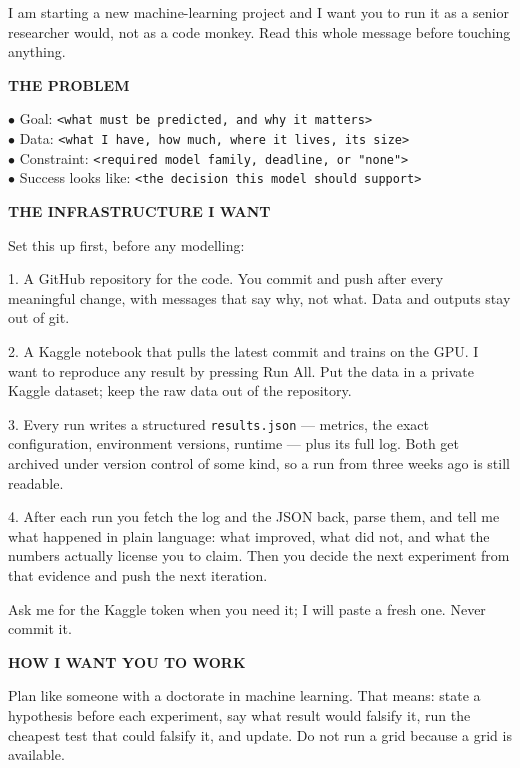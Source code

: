 \documentclass[11pt,a4paper]{article}
\begin{document}
\begin{promptbox}
\small
I am starting a new machine-learning project and I want you to run it as a
senior researcher would, not as a code monkey. Read this whole message before
touching anything.

\vspace{3pt}\textbf{THE PROBLEM}

$\bullet$ Goal: \texttt{<what must be predicted, and why it matters>}\\
$\bullet$ Data: \texttt{<what I have, how much, where it lives, its size>}\\
$\bullet$ Constraint: \texttt{<required model family, deadline, or "none">}\\
$\bullet$ Success looks like: \texttt{<the decision this model should support>}

\vspace{3pt}\textbf{THE INFRASTRUCTURE I WANT}

Set this up first, before any modelling:

1. A GitHub repository for the code. You commit and push after every meaningful
change, with messages that say why, not what. Data and outputs stay out of git.

2. A Kaggle notebook that pulls the latest commit and trains on the GPU. I want
to reproduce any result by pressing Run All. Put the data in a private Kaggle
dataset; keep the raw data out of the repository.

3. Every run writes a structured \texttt{results.json} --- metrics, the exact
configuration, environment versions, runtime --- plus its full log. Both get
archived under version control of some kind, so a run from three weeks ago is
still readable.

4. After each run you fetch the log and the JSON back, parse them, and tell me
what happened in plain language: what improved, what did not, and what the
numbers actually license you to claim. Then you decide the next experiment from
that evidence and push the next iteration.

Ask me for the Kaggle token when you need it; I will paste a fresh one. Never
commit it.

\vspace{3pt}\textbf{HOW I WANT YOU TO WORK}

Plan like someone with a doctorate in machine learning. That means: state a
hypothesis before each experiment, say what result would falsify it, run the
cheapest test that could falsify it, and update. Do not run a grid because a
grid is available.


\end{promptbox}
\end{document}
